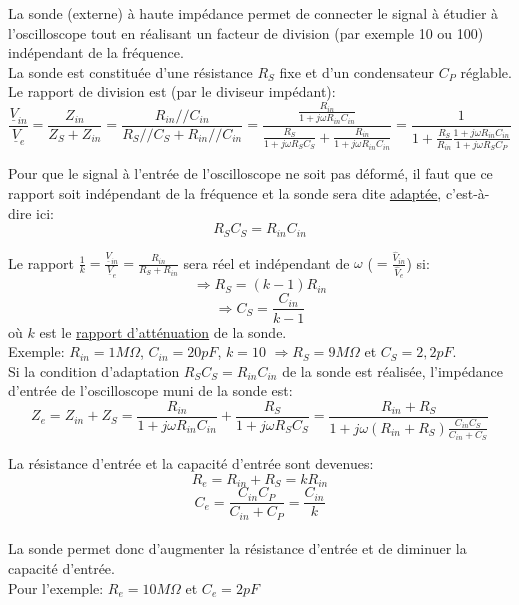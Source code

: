 {%
La sonde (externe) à haute impédance permet de connecter le signal à étudier à l’oscilloscope tout en réalisant un facteur de division (par exemple 10 ou 100) indépendant de la fréquence.\\
La sonde est constituée d’une résistance $R_S$ fixe et d’un condensateur $C_P$ réglable.\\

Le rapport de division est (par le diviseur impédant):\\
$$\frac{\underline{V}_{in}}{\underline{V}_e}=\frac{Z_{in}}{Z_S+Z_{in}}=\frac{R_{in}//C_{in}}{R_{S}//C_{S}+R_{in}//C_{in}}=\frac{\frac{R_{in}}{1+j\omega R_{in}C_{in}}}{\frac{R_{S}}{1+j\omega R_{S}C_{S}}+\frac{R_{in}}{1+j\omega R_{in}C_{in}}}=\frac{1}{1+\frac{R_S}{R_{in}}\frac{1+j\omega R_{in}C_{in}}{1+j\omega R_{S}C_{P}}}$$

Pour que le signal à l'entrée de l'oscilloscope ne soit pas déformé, il faut que ce rapport soit indépendant de la fréquence et la sonde sera dite \underline{adaptée}, c'est-à-dire ici:\\
$$R_SC_S=R_{in}C_{in}$$

Le rapport $\frac{1}{k}=\frac{\underline{V}_{in}}{\underline{V}_e}=\frac{R_{in}}{R_S+R_{in}}$ sera réel et indépendant de $\omega$ ($=\frac{\widehat{V}_{in}}{\widehat{V}_e}$) si:\\
$$\Rightarrow R_S=(k-1)R_{in}$$
$$\Rightarrow C_S=\frac{C_{in}}{k-1}$$
où $k$ est le \underline{rapport d'atténuation} de la sonde.\\

Exemple: $R_{in}=1M\Omega$, $C_{in}=20pF$, $k=10$ $\Rightarrow R_S=9M\Omega$ et $C_S=2,2pF$.\\

Si la condition d’adaptation $R_SC_S=R_{in}C_{in}$ de la sonde est réalisée, l’impédance d’entrée de l’oscilloscope muni de la sonde est:\\
$$Z_e=Z_{in}+Z_S=\frac{R_{in}}{1+j\omega R_{in}C_{in}}+\frac{R_{S}}{1+j\omega R_{S}C_{S}}=\frac{R_{in}+R_S}{1+j\omega (R_{in}+R_S) \frac{C_{in}C_S}{C_{in}+C_S}}$$

La résistance d'entrée et la capacité d'entrée sont devenues:\\
$$R_e=R_{in}+R_S=kR_{in}$$
$$C_e=\frac{C_{in}C_P}{C_{in}+C_P}=\frac{C_{in}}{k}$$\\

La sonde permet donc d'augmenter la résistance d'entrée et de diminuer la capacité d'entrée.\\

Pour l'exemple: $R_e=10M\Omega$ et $C_e=2pF$
}

